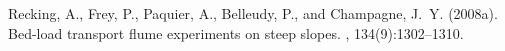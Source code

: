 \documentclass[11pt]{article}
\begin{document}
\begin{thebibliography}{3}
%
%
%
%
%
%
%
%
%
%

Recking, A., Frey, P., Paquier, A., Belleudy, P., and Champagne, J.~Y. (2008a).
\newblock Bed-load transport flume experiments on steep slopes.
, 134(9):1302--1310.


\end{thebibliography}
\end{document}
